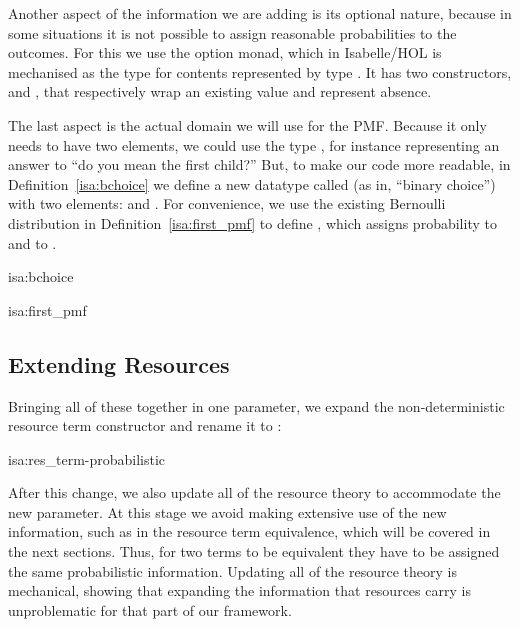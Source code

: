 \documentclass[class=smolathesis,crop=false]{standalone}
\begin{document}
Another aspect of the information we are adding is its optional nature, because in some situations it is not possible to assign reasonable probabilities to the outcomes.
For this we use the option monad, which in Isabelle/HOL is mechanised as the type  for contents represented by type .
It has two constructors,  and , that respectively wrap an existing value and represent absence.

The last aspect is the actual domain we will use for the PMF.
Because it only needs to have two elements, we could use the type , for instance representing an answer to ``do you mean the first child?''
But, to make our code more readable, in Definition~\ref{isa:bchoice} we define a new datatype called  (as in, ``binary choice'') with two elements:  and .
For convenience, we use the existing Bernoulli distribution in Definition~\ref{isa:first_pmf} to define , which assigns probability  to  and  to .

\begin{isadef}{isa:bchoice}
  
\end{isadef}

\begin{isadef}{isa:first_pmf}
  
\end{isadef}

\subsection{Extending Resources}
\label{sec:prob/add-prob-info/res}

Bringing all of these together in one parameter, we expand the non-deterministic resource term constructor and rename it to :
\begin{changebar}
\begin{isadef}{isa:res_term-probabilistic}
  
\end{isadef}
\end{changebar}

After this change, we also update all of the resource theory to accommodate the new parameter.
At this stage we avoid making extensive use of the new information, such as in the resource term equivalence, which will be covered in the next sections.
Thus, for two  terms to be equivalent they have to be assigned the same probabilistic information.
Updating all of the resource theory is mechanical, showing that expanding the information that resources carry is unproblematic for that part of our framework.
\end{document}
